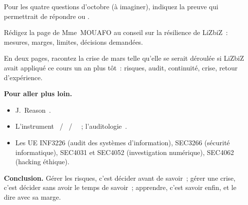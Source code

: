 \begin{boxexo}[title={\ding{45}\quad Exercice~26.8. Faire baisser U \niveaumoyen}]
Pour les quatre questions \NEK{} d'octobre (à imaginer), indiquez la preuve
qui permettrait de répondre \OUI{} ou \NON{}.
\end{boxexo}

\begin{boxexo}[title={\ding{45}\quad Exercice~26.9. Le rapport au conseil \niveauexpert}]
Rédigez la page de Mme~MOUAFO au conseil sur la résilience de LiZbiZ~:
mesures, marges, limites, décisions demandées.
\end{boxexo}

\begin{boxexo}[title={\ding{45}\quad Exercice~26.10. Synthèse \niveauexpert}]
En deux pages, racontez la crise de mars telle qu'elle se serait déroulée
si LiZbiZ avait appliqué ce cours un an plus tôt~: risques, audit,
continuité, crise, retour d'expérience.
\end{boxexo}

\bigskip

\begin{boxinfo}
\textbf{Pour aller plus loin.}
\begin{itemize}
    \item J.~Reason~\cite{reason1997}.
    \item L'instrument \OUI{}~/ \NON{}~/ \NEK{}~\cite{minka2026nek}~;
          l'auditologie~\cite{minka2026auditologie}.
    \item Les UE INF3226 (audit des systèmes d'information), SEC3266
          (sécurité informatique), SEC4031 et SEC4052 (investigation
          numérique), SEC4062 (hacking éthique).
\end{itemize}
\end{boxinfo}

\begin{boxinfo}
\textbf{Conclusion.} Gérer les risques, c'est décider avant de savoir~;
gérer une crise, c'est décider sans avoir le temps de savoir~; apprendre,
c'est savoir enfin, et le dire avec sa marge.
\end{boxinfo}

